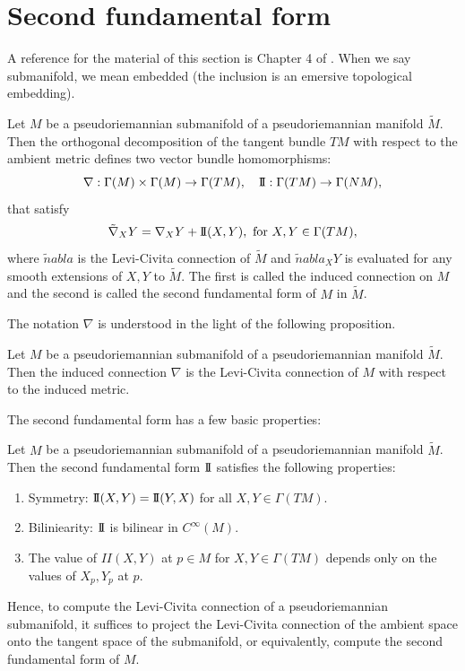 \documentclass{report}
\begin{document}
\section{Second fundamental form}
A reference for the material of this section is Chapter 4 of \cite{o1983semi}.
When we say submanifold, we mean embedded (the inclusion is an emersive topological embedding).
\begin{definition}
    Let $M$ be a pseudoriemannian submanifold of a pseudoriemannian manifold $\tilde M$.
    Then the orthogonal decomposition of the tangent bundle $TM$ with respect to the ambient metric defines two vector bundle homomorphisms: 
    \[
    \nabla : \Gamma(M) \times \Gamma(M) \to \Gamma(TM),\quad \operatorname{I\!I}: \Gamma(TM) \to \Gamma(NM), 
    \]
    that satisfy
    \[
    \tilde \nabla_X Y = \nabla_X Y + \operatorname{I\!I}(X,Y), \text{ for } X,Y \in \Gamma(TM),
    \]
    where $\tilde nabla$ is the Levi-Civita connection of $\tilde M$ and $\tilde nabla_X Y$ is evaluated for any smooth extensions of $X,Y$ to $\tilde M$.
    The first is called the induced connection on $M$ and the second is called the second fundamental form of $M$ in $\tilde M$.
\end{definition}
The notation $\nabla$ is understood in the light of the following proposition.
\begin{proposition}
    Let $M$ be a pseudoriemannian submanifold of a pseudoriemannian manifold $\tilde M$.
    Then the induced connection $\nabla$ is the Levi-Civita connection of $M$ with respect to the induced metric.
\end{proposition}
The second fundamental form has a few basic properties:
\begin{proposition}
    Let $M$ be a pseudoriemannian submanifold of a pseudoriemannian manifold $\tilde M$.
    Then the second fundamental form $\operatorname{I\!I}$ satisfies the following properties:
    \begin{enumerate}[label=(\roman*)]
        \item Symmetry: $\operatorname{I\!I}(X,Y) = \operatorname{I\!I}(Y,X)$ for all $X,Y \in \Gamma(TM)$.
        \item Biliniearity: $\operatorname{I\!I}$ is bilinear in $C^\infty(M)$.
        \item The value of $II(X,Y)$ at $p \in M$ for $X, Y \in \Gamma(TM)$ depends only on the values of $X_p, Y_p$ at $p$.
    \end{enumerate}
\end{proposition}
Hence, to compute the Levi-Civita connection of a pseudoriemannian submanifold, it suffices to project the Levi-Civita connection of the ambient space onto the tangent space of the submanifold, or equivalently, compute the second fundamental form of $M$.
\end{document}
